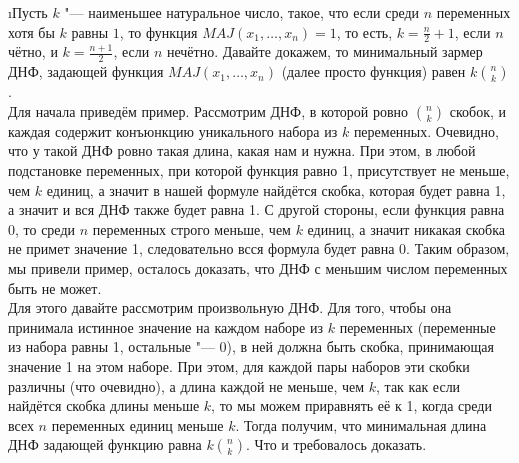 \i Пусть $k$ "--- наименьшее натуральное число, такое, что если среди $n$ переменных хотя бы $k$ равны $1$, то функция $MAJ(x_1, \ldots, x_n) = 1$, то есть, $k = \frac{n}{2} + 1$, если $n$ чётно, и $k = \frac{n+1}{2}$, если $n$ нечётно. Давайте докажем, то минимальный зармер ДНФ, задающей функция $MAJ(x_1, \ldots, x_n)$ (далее просто функция) равен $k\binom{n}{k}$.\\
Для начала приведём пример. Рассмотрим ДНФ, в которой ровно $\binom{n}{k}$ скобок, и каждая содержит конъюнкцию уникального набора из $k$ переменных. Очевидно, что у такой ДНФ ровно такая длина, какая нам и нужна. При этом, в любой подстановке переменных, при которой функция равно 1, присутствует не меньше, чем $k$ единиц, а значит в нашей формуле найдётся скобка, которая будет равна 1, а значит и вся ДНФ также будет равна 1. С другой стороны, если функция равна 0, то среди $n$ переменных строго меньше, чем $k$ единиц, а значит никакая скобка не примет значение 1, следовательно всся формула будет равна 0. Таким образом, мы привели пример, осталось доказать, что ДНФ с меньшим числом переменных быть не может.\\
Для этого давайте рассмотрим произвольную ДНФ. Для того, чтобы она принимала истинное значение на каждом наборе из $k$ переменных (переменные из набора равны 1, остальные "--- 0), в ней должна быть скобка, принимающая значение 1 на этом наборе. При этом, для каждой пары наборов эти скобки различны (что очевидно), а длина каждой не меньше, чем $k$, так как если найдётся скобка длины меньше $k$, то мы можем приравнять её к 1, когда среди всех $n$ переменных единиц меньше $k$. Тогда получим, что минимальная длина ДНФ задающей функцию равна $k\binom{n}{k}$. Что и требовалось доказать.